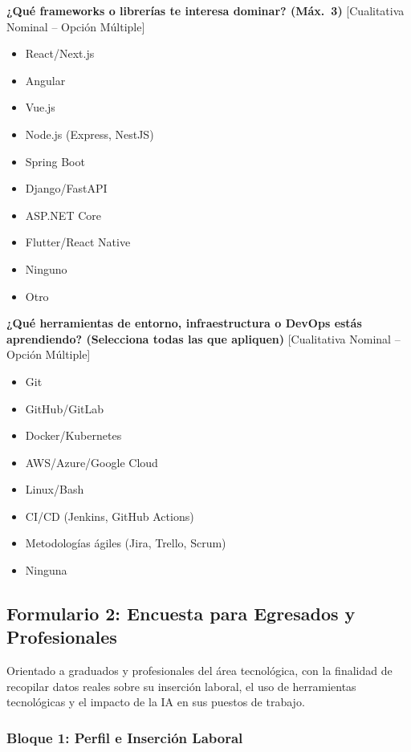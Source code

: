 \textbf{¿Qué frameworks o librerías te interesa dominar? (Máx.~3)} [Cualitativa Nominal -- Opción Múltiple]

\begin{itemize}
    \item React/Next.js
    \item Angular
    \item Vue.js
    \item Node.js (Express, NestJS)
    \item Spring Boot
    \item Django/FastAPI
    \item ASP.NET Core
    \item Flutter/React Native
    \item Ninguno
    \item Otro
\end{itemize}

\textbf{¿Qué herramientas de entorno, infraestructura o DevOps estás aprendiendo? (Selecciona todas las que apliquen)} [Cualitativa Nominal -- Opción Múltiple]

\begin{itemize}
    \item Git
    \item GitHub/GitLab
    \item Docker/Kubernetes
    \item AWS/Azure/Google Cloud
    \item Linux/Bash
    \item CI/CD (Jenkins, GitHub Actions)
    \item Metodologías ágiles (Jira, Trello, Scrum)
    \item Ninguna
\end{itemize}

\subsection{Formulario 2: Encuesta para Egresados y Profesionales}

Orientado a graduados y profesionales del área tecnológica, con la finalidad de recopilar datos reales sobre su inserción laboral, el uso de herramientas tecnológicas y el impacto de la IA en sus puestos de trabajo.

\subsubsection*{Bloque 1: Perfil e Inserción Laboral}

